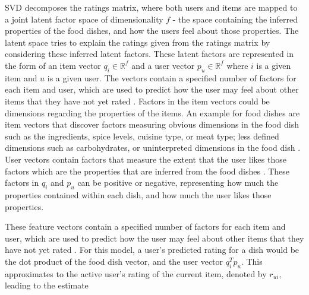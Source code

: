 SVD decomposes the ratings matrix, where both users and items are mapped to a joint latent factor space of dimensionality \begin{math} f \end{math} - the space containing the inferred properties of the food dishes, and how the users feel about those properties. The latent space tries to explain the ratings given from the ratings matrix by considering these inferred latent factors. These latent factors are represented in the form of an item vector \begin{math} q_{i} \in \mathbb{R}^f  \end{math} and a user vector \begin{math} p_{u} \in \mathbb{R}^f  \end{math} where \begin{math} i \end{math} is a given item and \begin{math} u \end{math} is a given user. The vectors contain a specified number of factors for each item and user, which are used to predict how the user may feel about other items that they have not yet rated \cite{koren2009matrix}. Factors in the item vectors could be dimensions regarding the properties of the items. An example for food dishes are item vectors that discover factors measuring obvious dimensions in the food dish such as the ingredients, spice levels, cuisine type, or meat type; less defined dimensions such as carbohydrates, or uninterpreted dimensions in the food dish \cite{koren2009matrix}. User vectors contain factors that measure the extent that the user likes those factors which are the properties that are inferred from the food dishes \cite{koren2009matrix}. These factors in \begin{math} q_{i} \end{math} and \begin{math} p_{u} \end{math} can be positive or negative, representing how much the properties contained within each dish, and how much the user likes those properties. 

These feature vectors contain a specified number of factors for each item and user, which are used to predict how the user may feel about other items that they have not yet rated \cite{koren2009matrix}. For this model, a user's predicted rating for a dish would be the dot product of the food dish vector, and the user vector \begin{math} q_{i}^T p_{u} \end{math}. This approximates to the active user's rating of the current item, denoted by \begin{math} r_{ui} \end{math}, leading to the estimate \cite{koren2009matrix}

